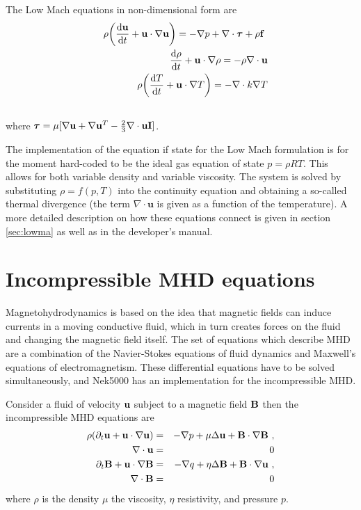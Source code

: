{The Low Mach equations in non-dimensional form are 
\begin{eqnarray}
&&\rho\bigg(\frac{\mathrm{d} \mathbf{u}}{\mathrm{d} t}+ \mathbf{u}\cdot\nabla\mathbf{u}\bigg)=-\nabla p+\nabla \cdot\boldsymbol{\tau}+\rho\mathbf{f}\ \\ \nonumber
&&\frac{\mathrm{d} \mathbf{\rho}}{\mathrm{d} t}+ \mathbf{u}\cdot\nabla\mathbf{\rho}=-\rho\nabla \cdot \mathbf{u}\\ \nonumber
&&\rho\bigg(\frac{\mathrm{d} T}{\mathrm{d} t}+ \mathbf{u}\cdot\nabla T\bigg)=-\nabla \cdot k \nabla T\\ \nonumber
\end{eqnarray}
where \(\boldsymbol{\tau}=\mu[\nabla \mathbf{u}+\nabla \mathbf{u}^{T}-\frac{2}{3}\nabla \cdot \mathbf{u} \mathbf{I}]\).


The implementation of the equation if state for the Low Mach formulation is for the moment hard-coded to be the ideal gas equation of state \(p=\rho R T\). This allows for both variable density and variable viscosity. The system is solved by substituting \(\rho=f(p,T)\) into the continuity equation and obtaining a so-called thermal divergence (the term \(\nabla \cdot \mathbf u\) is given as a function of the temperature).
A more detailed description on how these equations connect is given in section \ref{sec:lowma} as well as in the developer's manual.

\section{Incompressible MHD equations}\label{sec:mhd}
Magnetohydrodynamics is based on the idea that magnetic fields can induce currents in a moving conductive fluid, which in turn creates forces on the fluid and changing the magnetic field itself. The set of equations which describe MHD are a combination of the Navier-Stokes equations of fluid dynamics and Maxwell's equations of electromagnetism. These differential equations have to be solved simultaneously, and Nek5000 has an implementation for the incompressible MHD.

Consider a fluid of velocity \(\mathbf{u}\) subject to a magnetic field \(\mathbf{B}\) then the incompressible MHD equations are
\begin{eqnarray}
 \rho(\partial_{t} \mathbf u + \mathbf u \cdot \nabla \mathbf u) &=& - \nabla p + \mu \Delta \mathbf u + \bB\cdot \nabla \bB \ ,\\ 
 \nabla \cdot \mathbf u & =& 0\\ \nonumber
   \partial_{t} \bB + \mathbf u \cdot \nabla \bB &=& - \nabla q + \eta \Delta \bB + \bB\cdot \nabla \mathbf u \ ,\\ 
    \nabla \cdot \bB & =& 0 \nonumber
\end{eqnarray}
where \(\rho\) is the density \(\mu\) the viscosity, \(\eta\) resistivity, and pressure \(p\).


}
